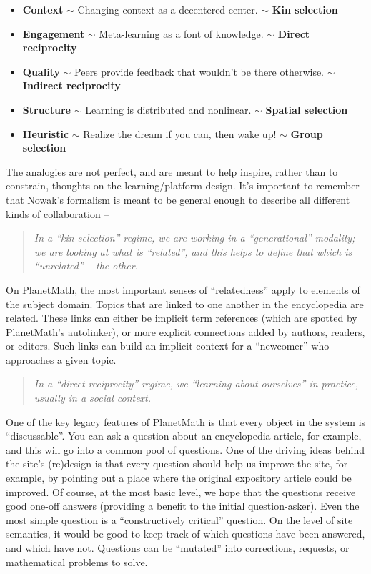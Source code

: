\begin{itemize}
\item
  \textbf{Context} \ensuremath{\sim} Changing context as a decentered
  center. \ensuremath{\sim} \textbf{Kin selection}
\item
  \textbf{Engagement} \ensuremath{\sim} Meta-learning as a font of
  knowledge. \ensuremath{\sim} \textbf{Direct reciprocity}
\item
  \textbf{Quality} \ensuremath{\sim} Peers provide feedback that
  wouldn't be there otherwise. \ensuremath{\sim} \textbf{Indirect
  reciprocity}
\item
  \textbf{Structure} \ensuremath{\sim} Learning is distributed and
  nonlinear. \ensuremath{\sim} \textbf{Spatial selection}
\item
  \textbf{Heuristic} \ensuremath{\sim} Realize the dream if you can,
  then wake up! \ensuremath{\sim} \textbf{Group selection}
\end{itemize}
The analogies are not perfect, and are meant to help inspire, rather
than to constrain, thoughts on the learning/platform design. It's
important to remember that Nowak's formalism is meant to be general
enough to describe all different kinds of collaboration --

\begin{quote}
\emph{In a ``kin selection'' regime, we are working in a
``generational'' modality; we are looking at what is ``related'', and
this helps to define that which is ``unrelated'' -- the other.}
\end{quote}
On PlanetMath, the most important senses of ``relatedness'' apply to
elements of the subject domain. Topics that are linked to one another in
the encyclopedia are related. These links can either be implicit term
references (which are spotted by PlanetMath's autolinker), or more
explicit connections added by authors, readers, or editors. Such links
can build an implicit context for a ``newcomer'' who approaches a given
topic.

\begin{quote}
\emph{In a ``direct reciprocity'' regime, we ``learning about
ourselves'' in practice, usually in a social context.}
\end{quote}
One of the key legacy features of PlanetMath is that every object in the
system is ``discussable''. You can ask a question about an encyclopedia
article, for example, and this will go into a common pool of questions.
One of the driving ideas behind the site's (re)design is that every
question should help us improve the site, for example, by pointing out a
place where the original expository article could be improved. Of
course, at the most basic level, we hope that the questions receive good
one-off answers (providing a benefit to the initial question-asker).
Even the most simple question is a ``constructively critical'' question.
On the level of site semantics, it would be good to keep track of which
questions have been answered, and which have not. Questions can be
``mutated'' into corrections, requests, or mathematical problems to
solve.

